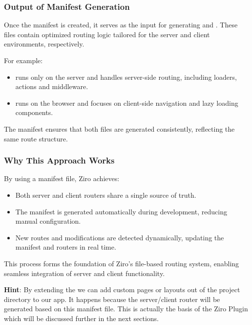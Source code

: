 \subsubsection{Output of Manifest Generation}
Once the manifest is created, it serves as the input for generating  and . These files contain optimized routing logic tailored for the server and client environments, respectively.

For example:
\begin{itemize}
  \item {} runs only on the server and handles server-side routing, including loaders, actions and middleware.
  \item {} runs on the browser and focuses on client-side navigation and lazy loading components.
\end{itemize}
The manifest ensures that both files are generated consistently, reflecting the same route structure.


\subsubsection{Why This Approach Works}
By using a manifest file, Ziro achieves:
\begin{itemize}
  \item Both server and client routers share a single source of truth.
  \item The manifest is generated automatically during development, reducing manual configuration.
  \item New routes and modifications are detected dynamically, updating the manifest and routers in real time.
\end{itemize}

This process forms the foundation of Ziro’s file-based routing system, enabling seamless integration of server and client functionality.

\textbf{Hint}: By extending the  we can add custom pages or layouts out of the project directory to our app. It happens because the server/client router will be generated based on this manifest file. This is actually the basis of the Ziro Plugin which will be discussed further in the next sections.

